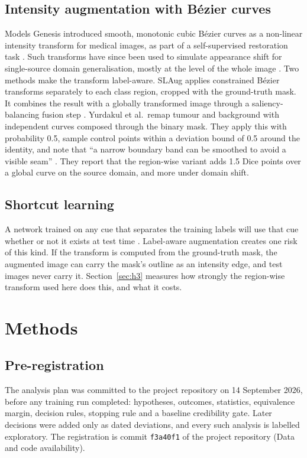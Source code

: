 \documentclass[11pt,a4paper]{article}
\begin{document}
\subsection{Intensity augmentation with B\'ezier curves}

Models Genesis introduced smooth, monotonic cubic B\'ezier curves as a non-linear
intensity transform for medical images, as part of a self-supervised restoration
task \citep{zhou2021genesis}. Such transforms have since been used to simulate
appearance shift for single-source domain generalisation, mostly at the level of
the whole image \citep{zhou2022style}. Two methods make the transform
label-aware. SLAug applies constrained B\'ezier transforms separately to each
class region, cropped with the ground-truth mask. It combines the result with a
globally transformed image through a saliency-balancing fusion step
\citep{su2023slaug}. Yurdakul et al.\ remap tumour and background with
independent curves composed through the binary mask. They apply this with
probability 0.5, sample control points within a deviation bound of 0.5 around
the identity, and note that ``a narrow boundary band can be smoothed to avoid a
visible seam'' \citep{yurdakul2026}. They report that the region-wise variant
adds 1.5 Dice points over a global curve on the source domain, and more under
domain shift.

\subsection{Shortcut learning}

A network trained on any cue that separates the training labels will use that cue
whether or not it exists at test time \citep{geirhos2020}. Label-aware
augmentation creates one risk of this kind. If the transform is computed from the
ground-truth mask, the augmented image can carry the mask's outline as an
intensity edge, and test images never carry it. Section~\ref{sec:h3} measures how
strongly the region-wise transform used here does this, and what it costs.

\section{Methods}
\label{sec:methods}

\subsection{Pre-registration}
The analysis plan was committed to the project repository on 14 September 2026,
before any training run completed: hypotheses, outcomes, statistics, equivalence
margin, decision rules, stopping rule and a baseline credibility gate. Later
decisions were added only as dated deviations, and every such analysis is labelled
exploratory. The registration is commit \texttt{f3a40f1} of the project repository (Data and code availability).
\end{document}
